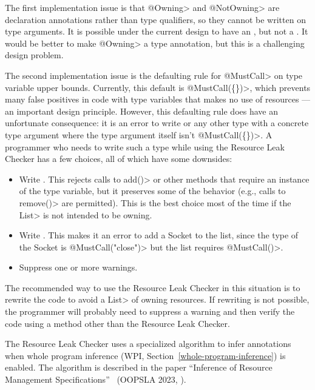 The first implementation issue is that \<@Owning> and \<@NotOwning> are
declaration annotations rather than type qualifiers, so they cannot be
written on type arguments. It is possible under the current design to have
an , but not a .
It would be better to make \<@Owning> a type annotation, but this is a
challenging design problem.

The second implementation issue is the defaulting rule for \<@MustCall> on
type variable upper bounds.  Currently, this default is \<@MustCall(\{\})>,
which prevents many false positives in code with type variables that makes
no use of resources --- an important design principle.
However, this defaulting rule does have an unfortunate consequence: it is
an error to write  or any other type with a concrete
type argument where the type argument itself isn't \<@MustCall(\{\})>. A programmer who
needs to write such a type while using the Resource Leak Checker has a few
choices, all of which have some downsides:

\begin{itemize}
\item Write . This rejects calls to \<add()>
or other methods that require an instance of the type variable, but it
preserves some of the behavior (e.g., calls to \<remove()> are permitted).
This is the best choice most of the time if the \<List> is not intended to
be owning.
\item Write . This makes it an error to
add a Socket to the list, since the type of the Socket is
\<@MustCall("close")> but the list requires \<@MustCall()>.
\item Suppress one or more warnings.
\end{itemize}

The recommended way to use the Resource Leak Checker in this situation is
to rewrite the code to avoid a \<List> of owning resources. If rewriting is
not possible, the programmer will probably need to suppress a warning and
then verify the code using a method other than the Resource Leak Checker.



The Resource Leak Checker uses a specialized algorithm to infer annotations
when whole program inference (WPI, Section~\ref{whole-program-inference})
is enabled.  The algorithm is described in the paper ``Inference of
Resource Management Specifications''~\cite{ShadabGTEKLLS2023} (OOPSLA 2023,
).


